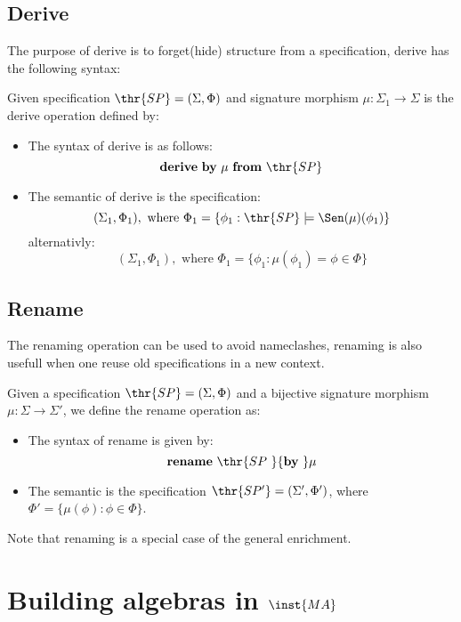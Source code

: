 \subsection{Derive}

The purpose of derive is to forget(hide) structure from a specification, derive has the following syntax:

\begin{definition}
Given specification $\thr{SP}=(\Sigma,\Phi)$ and signature morphism $\mu: \Sigma_1 \to \Sigma$ is the derive operation defined by:
	\begin{itemize}
	\item The syntax of derive is as follows: 
		\[ {\bf derive\ by\ } \mu  {\bf  \ from \ } \thr{SP} \]
	\item The semantic of derive is the specification:
		 \[ (\Sigma_1,\Phi_1),\mbox{ where } \Phi_1= \{ \phi_1: \thr{SP} \models \Sen(\mu)(\phi_1) \} \]
	alternativly:
		\[ (\Sigma_1,\Phi_1),\mbox{ where } \Phi_1= \{ \phi_1: \mu(\phi_1) = \phi \in \Phi \} \]
	\end{itemize}
\end{definition}



\subsection{Rename}
The renaming operation can be used to avoid nameclashes, renaming is also usefull when one reuse old specifications in a new context.

\begin{definition}
Given a specification $\thr{SP}= (\Sigma, \Phi)$ and a bijective signature morphism $\mu: \Sigma \to \Sigma'$, we define the rename operation as:
	\begin{itemize}
	\item The syntax of rename is given by:
	 	\[ {\bf rename\ } \thr{SP\ } {\bf by\ } \mu \]
	\item The semantic is the specification $\thr{SP'}=(\Sigma', \Phi')$, where $\Phi'= \{ \mu(\phi) : \phi \in \Phi \}$.
	\end{itemize}
\end{definition}

Note that renaming is a special case of the general enrichment.

\section{Building algebras in $\inst{MA}$}
\label{se:algbuild}

